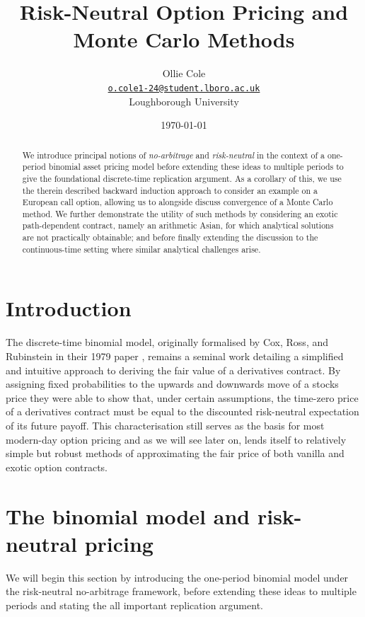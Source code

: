 \documentclass[]{article}
\title{Risk-Neutral Option Pricing and Monte Carlo Methods}
\author{Ollie Cole\\
\href{mailto:o.cole1-24@student.lboro.ac.uk}{\texttt{o.cole1-24@student.lboro.ac.uk}}\\
Loughborough University}
\date{\today}
\theoremstyle{remark}
\theoremstyle{plain}
\begin{document}
\maketitle

\begin{abstract}
\noindent We introduce principal notions of \textit{no-arbitrage} and \textit{risk-neutral} in the context of a one-period binomial asset pricing model before extending these ideas to multiple periods to give the foundational discrete-time replication argument. As a corollary of this, we use the therein described backward induction approach to consider an example on a European call option, allowing us to alongside discuss convergence of a Monte Carlo method. We further demonstrate the utility of such methods by considering an exotic path-dependent contract, namely an arithmetic Asian, for which analytical solutions are not practically obtainable; and before finally extending the discussion to the continuous-time setting where similar analytical challenges arise.
\end{abstract}

\section{Introduction}

The discrete-time binomial model, originally formalised by Cox, Ross, and Rubinstein in their 1979 paper \cite{CRR_1979}, remains a seminal work detailing a simplified and intuitive approach to deriving the fair value of a derivatives contract. By assigning fixed probabilities to the upwards and downwards move of a stocks price they were able to show that, under certain assumptions, the time-zero price of a derivatives contract must be equal to the discounted risk-neutral expectation of its future payoff. This characterisation still serves as the basis for most modern-day option pricing and as we will see later on, lends itself to relatively simple but robust methods of approximating the fair price of both vanilla and exotic option contracts.

\section{The binomial model and risk-neutral pricing}\label{sec:risk_neutral_and_binomial}

We will begin this section by introducing the one-period binomial model under the risk-neutral no-arbitrage framework, before extending these ideas to multiple periods and stating the all important replication argument.
\end{document}
